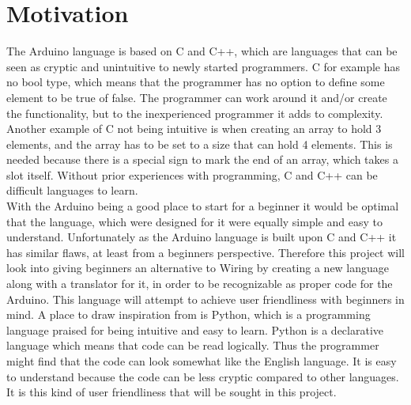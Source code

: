 \section{Motivation}\label{introduction:motivation}
The Arduino language is based on C and C++, which are languages that can be seen as cryptic and unintuitive to newly started programmers. C for example has no bool type, which means that the programmer has no option to define some element to be true of false. The programmer can work around it and/or create the functionality, but to the inexperienced programmer it adds to complexity. Another example of C not being intuitive is when creating an array to hold 3 elements, and the array has to be set to a size that can hold 4 elements. This is needed because there is a special sign to mark the end of an array, which takes a slot itself.  Without prior experiences with programming, C and C++ can be difficult languages to learn. \\

With the Arduino being a good place to start for a beginner it would be optimal that the language, which were designed for it were equally simple and easy to understand. Unfortunately as the Arduino language is built upon C and C++ it has similar flaws, at least from a beginners perspective. Therefore this project will look into giving beginners an alternative to Wiring by creating a new language along with a translator for it, in order to be recognizable as proper code for the Arduino. This language will attempt to achieve user friendliness with beginners in mind. A place to draw inspiration from is Python, which is a programming language praised for being intuitive and easy to learn. \cite{python:about} Python is a declarative language which means that code can be read logically. Thus the programmer might find that the code can look somewhat like the English language. It is easy to understand because the code can be less cryptic compared to other languages. It is this kind of user friendliness that will be sought in this project.